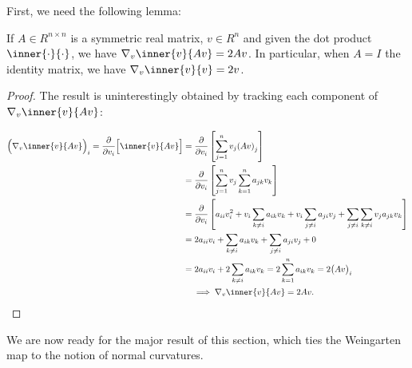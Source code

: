 	
	First, we need the following lemma:
    \begin{lemma}
        If $A\in R^{n\times n}$ is a symmetric real matrix, $v \in R^n$
        and given the dot product $\inner{\cdot}{\cdot}$,
        we have $\nabla_{v} \inner{v}{Av} = 2Av$.
        In particular, when $A = I$ the identity matrix, we have
        $ \nabla_{v} \inner{v}{v} = 2v$.
    \end{lemma}
    
    \begin{proof}
        The result is uninterestingly obtained by tracking
        each component of
        $\nabla_{v} \inner{v}{Av}$:
        
        \begin{align}
        {\Big(\nabla_{v} \inner{v}{Av}\Big)}_{i} =
                \frac{\partial}{\partial v_i} \Big[
                \inner{v}{Av}\Big]
                &=  \frac{\partial}{\partial v_i} \left[
                    \sum_{j=1}^{n} v_j {(Av)}_j\right] \\
                &=	\frac{\partial}{\partial v_i} \left[
                \sum_{j=1}^{n} v_j \sum_{k=1}^n a_{jk} v_k \right] \\
                &= \frac{\partial}{\partial v_i} \left[
                a_{ii} v_i^2 + v_i \sum_{k\ne i} a_{ik} v_k
                 + v_i \sum_{j\ne i} a_{ji} v_j
                 + \sum_{j\ne i} \sum_{k \ne i} v_j a_{jk} v_k \right] \\
    &=  2 a_{ii} v_i + \sum_{k\ne i} a_{ik} v_k
    + \sum_{j\ne i} a_{ji} v_j + 0 \\
    &= 2 a_{ii} v_i + 2 \sum_{k\ne i} a_{ik} v_k
     = 2 \sum_{k=1}^n a_{ik}v_{k} = 2 {\big(Av\big)}_i \\
     &\quad \implies \nabla_{v} \inner{v}{Av} = 2Av.
        \end{align}
    \end{proof}
    
    We are now ready for the major result of this section, which ties the Weingarten map to the
    notion of normal curvatures.
    
